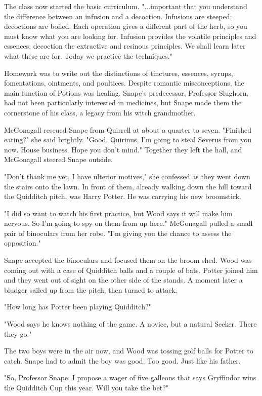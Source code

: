 The class now started the basic curriculum. "...important that you understand the difference between an infusion and a decoction. Infusions are steeped; decoctions are boiled. Each operation gives a different part of the herb, so you must know what you are looking for. Infusion provides the volatile principles and essences, decoction the extractive and resinous principles. We shall learn later what these are for. Today we practice the techniques."

Homework was to write out the distinctions of tinctures, essences, syrups, fomentations, ointments, and poultices. Despite romantic misconceptions, the main function of Potions was healing. Snape's predecessor, Professor Slughorn, had not been particularly interested in medicines, but Snape made them the cornerstone of his class, a legacy from his witch grandmother.

McGonagall rescued Snape from Quirrell at about a quarter to seven. "Finished eating?" she said brightly. "Good. Quirinus, I'm going to steal Severus from you now. House business. Hope you don't mind." Together they left the hall, and McGonagall steered Snape outside.

"Don't thank me yet, I have ulterior motives," she confessed as they went down the stairs onto the lawn. In front of them, already walking down the hill toward the Quidditch pitch, was Harry Potter. He was carrying his new broomstick.

"I did so want to watch his first practice, but Wood says it will make him nervous. So I'm going to spy on them from up here." McGonagall pulled a small pair of binoculars from her robe. "I'm giving you the chance to assess the opposition."

Snape accepted the binoculars and focused them on the broom shed. Wood was coming out with a case of Quidditch balls and a couple of bats. Potter joined him and they went out of sight on the other side of the stands. A moment later a bludger sailed up from the pitch, then turned to attack.

"How long has Potter been playing Quidditch?"

"Wood says he knows nothing of the game. A novice, but a natural Seeker. There they go."

The two boys were in the air now, and Wood was tossing golf balls for Potter to catch. Snape had to admit the boy was good. Too good. Just like his father.

"So, Professor Snape, I propose a wager of five galleons that says Gryffindor wins the Quidditch Cup this year. Will you take the bet?"


